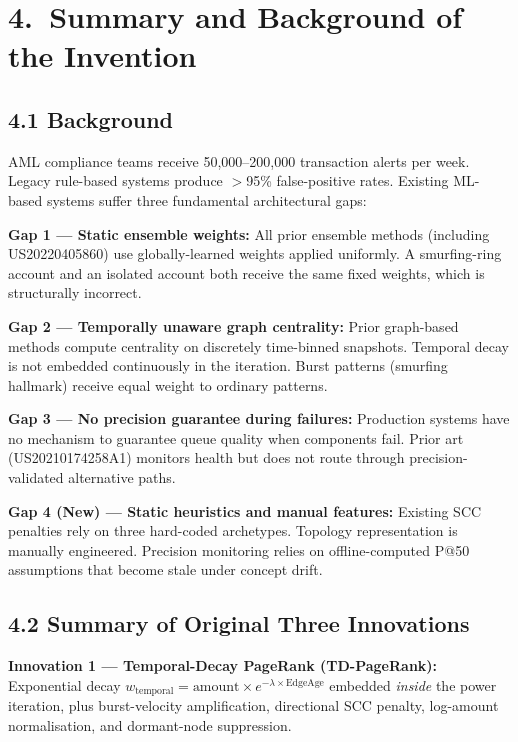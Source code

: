 \documentclass[12pt,a4paper]{article}
\begin{document}
\section{4.\ Summary and Background of the Invention}

\subsection{4.1 Background}

AML compliance teams receive 50,000--200,000 transaction alerts per week. Legacy rule-based
systems produce \(>\)95\% false-positive rates. Existing ML-based systems suffer three
fundamental architectural gaps:

\textbf{Gap 1 --- Static ensemble weights:} All prior ensemble methods (including
US20220405860) use globally-learned weights applied uniformly. A smurfing-ring account
and an isolated account both receive the same fixed weights, which is structurally incorrect.

\textbf{Gap 2 --- Temporally unaware graph centrality:} Prior graph-based methods compute
centrality on discretely time-binned snapshots. Temporal decay is not embedded continuously
in the iteration. Burst patterns (smurfing hallmark) receive equal weight to ordinary patterns.

\textbf{Gap 3 --- No precision guarantee during failures:} Production systems have no mechanism
to guarantee queue quality when components fail. Prior art (US20210174258A1) monitors health
but does not route through precision-validated alternative paths.

\textbf{Gap 4 (New) --- Static heuristics and manual features:} Existing SCC penalties rely on
three hard-coded archetypes. Topology representation is manually engineered. Precision monitoring
relies on offline-computed P@50 assumptions that become stale under concept drift.

\subsection{4.2 Summary of Original Three Innovations}

\textbf{Innovation 1 --- Temporal-Decay PageRank (TD-PageRank):} Exponential decay
$w_\text{temporal}=\text{amount}\times e^{-\lambda\times\text{EdgeAge}}$ embedded
\emph{inside} the power iteration, plus burst-velocity amplification, directional SCC penalty,
log-amount normalisation, and dormant-node suppression.
\end{document}
